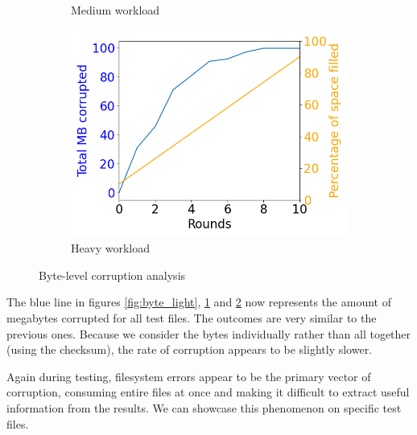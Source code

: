 \documentclass[a4paper,11pt,oneside]{report}
\begin{document}
\begin{figure}[ht]
\begin{subfigure}[b]{0.3\textwidth}
         \caption{Medium workload}
         \label{fig:byte_medium}
     \end{subfigure}
     \hfill
     \begin{subfigure}[b]{0.3\textwidth}
         \centering
         \includegraphics[width=\textwidth]{Figures/sum_byte_corrupt_4MB.png}
         \caption{Heavy workload}
         \label{fig:byte_heavy}
     \end{subfigure}
        \caption{Byte-level corruption analysis}
        \label{fig:byte_analysis}
\end{figure}

The blue line in figures \ref{fig:byte_light}, \ref{fig:byte_medium} and \ref{fig:byte_heavy} now represents the amount of megabytes corrupted for all test files. The outcomes are very similar to the previous ones. Because we consider the bytes individually rather than all together (using the checksum), the rate of corruption appears to be slightly slower.

Again during testing, filesystem errors appear to be the primary vector of corruption, consuming entire files at once and making it difficult to extract useful information from the results. We can showcase this phenomenon on specific test files.
\end{document}
